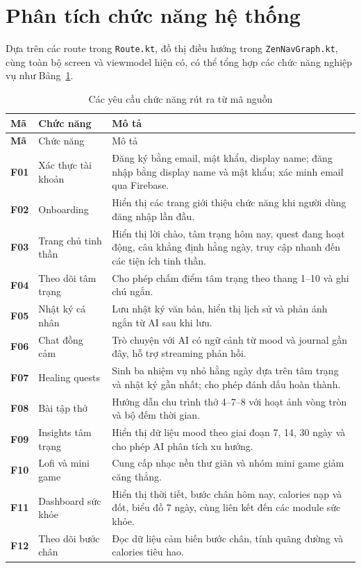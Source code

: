 \documentclass{zenbuddy-report}
\begin{document}
\section{Phân tích chức năng hệ thống}
Dựa trên các route trong \texttt{Route.kt}, đồ thị điều hướng trong \texttt{ZenNavGraph.kt}, cùng toàn bộ screen và viewmodel hiện có, có thể tổng hợp các chức năng nghiệp vụ như Bảng~\ref{tab:functional-requirements}.

\begin{longtable}{>{\bfseries}p{1.7cm}p{3.4cm}p{8.2cm}}
\caption{Các yêu cầu chức năng rút ra từ mã nguồn}\label{tab:functional-requirements}\\
\toprule
Mã & Chức năng & Mô tả \\
\midrule
\endfirsthead
\toprule
Mã & Chức năng & Mô tả \\
\midrule
\endhead
F01 & Xác thực tài khoản & Đăng ký bằng email, mật khẩu, display name; đăng nhập bằng display name và mật khẩu; xác minh email qua Firebase. \\
F02 & Onboarding & Hiển thị các trang giới thiệu chức năng khi người dùng đăng nhập lần đầu. \\
F03 & Trang chủ tinh thần & Hiển thị lời chào, tâm trạng hôm nay, quest đang hoạt động, câu khẳng định hằng ngày, truy cập nhanh đến các tiện ích tinh thần. \\
F04 & Theo dõi tâm trạng & Cho phép chấm điểm tâm trạng theo thang 1--10 và ghi chú ngắn. \\
F05 & Nhật ký cá nhân & Lưu nhật ký văn bản, hiển thị lịch sử và phản ánh ngắn từ AI sau khi lưu. \\
F06 & Chat đồng cảm & Trò chuyện với AI có ngữ cảnh từ mood và journal gần đây, hỗ trợ streaming phản hồi. \\
F07 & Healing quests & Sinh ba nhiệm vụ nhỏ hằng ngày dựa trên tâm trạng và nhật ký gần nhất; cho phép đánh dấu hoàn thành. \\
F08 & Bài tập thở & Hướng dẫn chu trình thở 4--7--8 với hoạt ảnh vòng tròn và bộ đếm thời gian. \\
F09 & Insights tâm trạng & Hiển thị dữ liệu mood theo giai đoạn 7, 14, 30 ngày và cho phép AI phân tích xu hướng. \\
F10 & Lofi và mini game & Cung cấp nhạc nền thư giãn và nhóm mini game giảm căng thẳng. \\
F11 & Dashboard sức khỏe & Hiển thị thời tiết, bước chân hôm nay, calories nạp và đốt, biểu đồ 7 ngày, cùng liên kết đến các module sức khỏe. \\
F12 & Theo dõi bước chân & Đọc dữ liệu cảm biến bước chân, tính quãng đường và calories tiêu hao. \\

\end{longtable}
\end{document}
